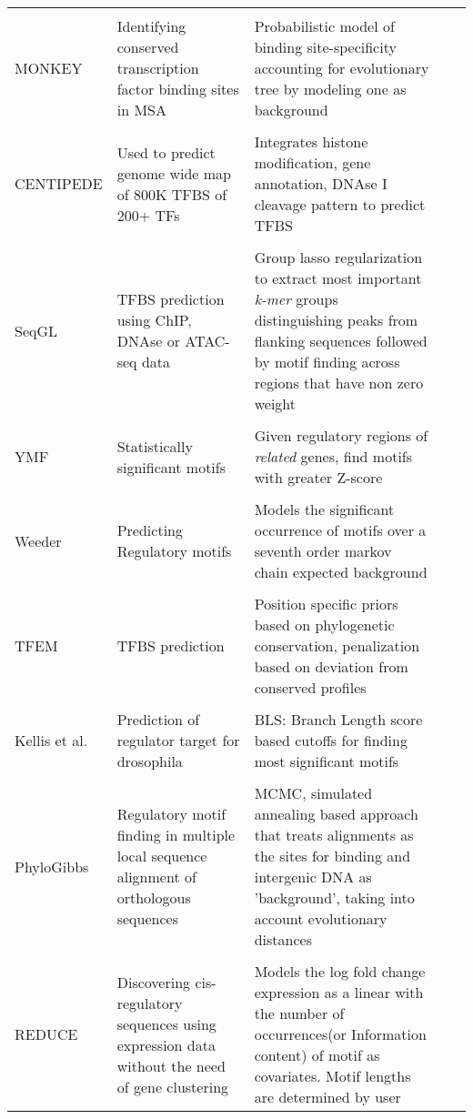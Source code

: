 \documentclass[a4paper,11pt]{article}
\newcommand{\red}[1]{{\color{red!80!orange}#1}}
\newcommand{\cmark}{\ding{51}}%
\newcommand{\xmark}{\ding{55}}%
\begin{document}
\begin{longtable}{ P{3cm} p{4.6cm} p{4.6cm} P{2cm} P{2cm}  }
\hline \\
\red{MONKEY} & Identifying conserved transcription factor binding sites in MSA & Probabilistic model of binding site-specificity accounting for evolutionary tree by modeling one as background  & \cite{moses_monkey:_2004} &  \xmark \\
\hline\\
\red{CENTIPEDE} & Used to predict genome wide map of 800K TFBS of 200+ TFs & Integrates histone modification, gene annotation, DNAse I cleavage pattern to predict TFBS & \cite{pique-regi_accurate_2011} & \cmark \\
\hline\\
SeqGL &  TFBS prediction using ChIP, DNAse  or ATAC-seq data & Group lasso regularization to extract most important \textit{k-mer} groups distinguishing peaks from flanking sequences followed by motif finding across regions that have non zero weight &  \cite{setty_seqgl_2015} & \cmark \\
\hline\\
YMF & Statistically significant motifs &  Given regulatory regions of \textit{related} genes, find motifs with greater Z-score & \cite{sinha_ymf:_2003} &  \xmark \\
\hline\\
Weeder & Predicting Regulatory motifs & Models the significant occurrence of motifs over a seventh order markov chain expected background & \cite{pavesi_weeder_2004} & \cmark \\
\hline\\
\red{TFEM} & TFBS prediction & Position specific priors based on phylogenetic conservation, penalization based on deviation from conserved profiles & \cite{kechris_detecting_2004} & \cmark \\
\hline\\
\red{Kellis et al.} & Prediction of regulator target for drosophila &  BLS: Branch Length score based cutoffs for finding most significant motifs  & \cite{kheradpour_reliable_2007} & \cmark \\
\hline\\
\red{PhyloGibbs} & Regulatory motif finding in multiple local sequence alignment of orthologous sequences  &  MCMC, simulated annealing based approach that treats alignments as the sites for binding and intergenic DNA as 'background', taking into account evolutionary distances& \cite{siddharthan_phylogibbs:_2005} & \xmark \\
\hline\\
REDUCE & Discovering cis-regulatory sequences using expression data without the need of gene clustering &  Models the log fold change expression as a linear with the number of occurrences(or Information content) of motif as covariates. Motif lengths are determined by user &  \cite{bussemaker_regulatory_2001} & \xmark \\

\end{longtable}
\end{document}

